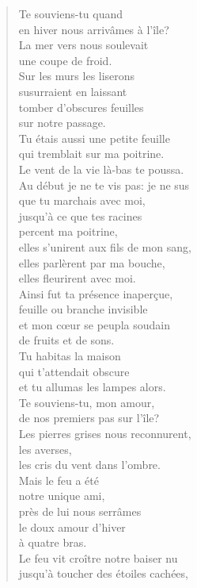 \documentclass[11pt,a4paper]{book}
\begin{document}
\begin{verse}
Te souviens-tu quand \\
en hiver nous arrivâmes à l'île? \\
La mer vers nous soulevait \\
une coupe de froid. \\
Sur les murs les liserons \\
susurraient en laissant \\
tomber d'obscures feuilles \\
sur notre passage. \\
Tu étais aussi une petite feuille \\
qui tremblait sur ma poitrine. \\
Le vent de la vie là-bas te poussa. \\
Au début je ne te vis pas: je ne sus \\
que tu marchais avec moi, \\
jusqu'à ce que tes racines \\
percent ma poitrine, \\
elles s'unirent aux fils de mon sang, \\
elles parlèrent par ma bouche, \\
elles fleurirent avec moi. \\
Ainsi fut ta présence inaper\c{c}ue, \\
feuille ou branche invisible \\
et mon c{\oe}ur se peupla soudain \\
de fruits et de sons. \\
Tu habitas la maison \\
qui t'attendait obscure \\
et tu allumas les lampes alors. \\
Te souviens-tu, mon amour, \\
de nos premiers pas sur l'île? \\
Les pierres grises nous reconnurent, \\
les averses, \\
les cris du vent dans l'ombre. \\
Mais le feu a été \\
notre unique ami, \\
près de lui nous serrâmes \\
le doux amour d'hiver \\
à quatre bras. \\
Le feu vit croître notre baiser nu \\
jusqu'à toucher des étoiles cachées, \\

\end{verse}
\end{document}
